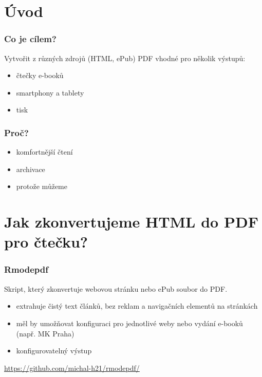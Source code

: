 
\section{Úvod}

\begin{frame}
  \frametitle{Co je cílem?}
    Vytvořit z různých zdrojů (HTML, ePub) PDF vhodné pro několik výstupů:
    \begin{itemize}
      \item čtečky e-booků
      \item smartphony a tablety
      \item tisk
    \end{itemize}

  \end{frame}
  \begin{frame}
    \frametitle{Proč?}

    \begin{itemize}
      \item komfortnější čtení
      \item archivace
      \item protože můžeme
    \end{itemize}


\end{frame}

\section{Jak zkonvertujeme HTML do PDF pro čtečku?}

\begin{frame}
  \frametitle{Rmodepdf}

  Skript, který zkonvertuje webovou stránku nebo ePub soubor do PDF.

  \begin{itemize}
    \item extrahuje čistý text článků, bez reklam a navigačních elementů na stránkách
    \item měl by umožňovat konfiguraci pro jednotlivé weby nebo vydání e-booků (např. MK Praha)
    \item konfigurovatelný výstup
  \end{itemize}


    

    \url{https://github.com/michal-h21/rmodepdf/}
  \end{frame}

